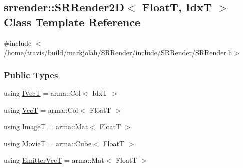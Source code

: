 \hypertarget{classsrrender_1_1SRRender2D}{}\subsection{srrender\+:\+:S\+R\+Render2D$<$ FloatT, IdxT $>$ Class Template Reference}
\label{classsrrender_1_1SRRender2D}


{\ttfamily \#include $<$/home/travis/build/markjolah/\+S\+R\+Render/include/\+S\+R\+Render/\+S\+R\+Render.\+h$>$}

\subsubsection*{Public Types}
\begin{DoxyCompactItemize}
\item 
using \hyperlink{classsrrender_1_1SRRender2D_abf2e65ab6bcf77af73d3988cc3d457b9}{I\+VecT} = arma\+::\+Col$<$ IdxT $>$
\item 
using \hyperlink{classsrrender_1_1SRRender2D_ab2b17bb30a0f86d610ef90e2e8e97e25}{VecT} = arma\+::\+Col$<$ FloatT $>$
\item 
using \hyperlink{classsrrender_1_1SRRender2D_a84ba69a439ee39a97bb8fed4eebac011}{ImageT} = arma\+::\+Mat$<$ FloatT $>$
\item 
using \hyperlink{classsrrender_1_1SRRender2D_a884febde0e56f7e07fd470f2498eadbd}{MovieT} = arma\+::\+Cube$<$ FloatT $>$
\item 
using \hyperlink{classsrrender_1_1SRRender2D_ac2433ed86b4b21ff082ba8c2a080e26a}{Emitter\+VecT} = arma\+::\+Mat$<$ FloatT $>$
\end{DoxyCompactItemize}
